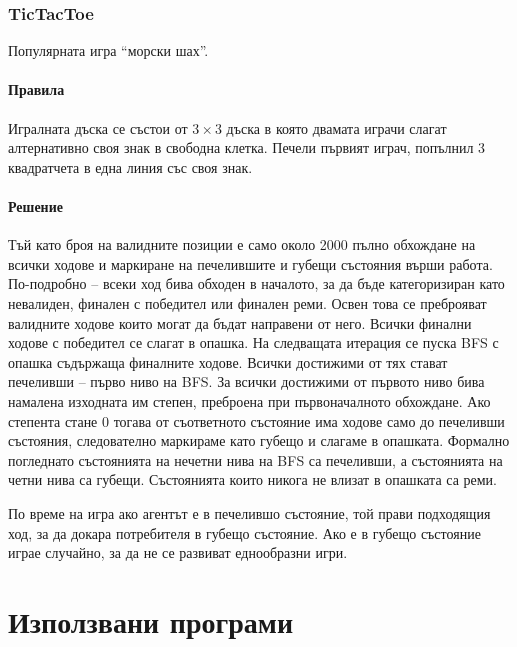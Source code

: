 \documentclass[a4paper]{article}
\begin{document}
    \subsubsection{TicTacToe}
    Популярната игра ``морски шах''.

    \paragraph{Правила}
    Игралната дъска се състои от $3 \times 3$ дъска в която двамата играчи
    слагат алтернативно своя знак в свободна клетка. Печели първият играч,
    попълнил 3 квадратчета в една линия със своя знак.

    \paragraph{Решение}
    Тъй като броя на валидните позиции е само около 2000 пълно обхождане на
    всички ходове и маркиране на печелившите и губещи състояния върши работа.
    По-подробно -- всеки ход бива обходен в началото, за да бъде категоризиран
    като невалиден, финален с победител или финален реми. Освен това се
    преброяват валидните ходове които могат да бъдат направени от него. Всички
    финални ходове с победител се слагат в опашка. На следващата итерация се
    пуска BFS с опашка съдържаща финалните ходове. Всички достижими от тях
    стават печеливши -- първо ниво на BFS. За всички достижими от първото ниво
    бива намалена изходната им степен, преброена при първоначалното обхождане.
    Ако степента стане 0 тогава от съответното състояние има ходове само до
    печеливши състояния, следователно маркираме като губещо и слагаме
    в опашката. Формално погледнато състоянията на нечетни нива на BFS са
    печеливши, а състоянията на четни нива са губещи. Състоянията които никога
    не влизат в опашката са реми.

    По време на игра ако агентът е в печелившо състояние, той прави подходящия
    ход, за да докара потребителя в губещо състояние. Ако е в губещо състояние
    играе случайно, за да не се развиват еднообразни игри.

\section{Използвани програми}
\end{document}
